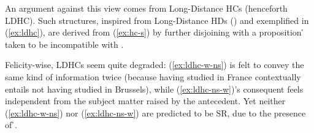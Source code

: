 An argument against this view comes from Long-Distance HCs (henceforth LDHC). Such structures, inspired from Long-Distance HDs (\cite{Marty2022}) and exemplified in (\ref{ex:ldhc}), are derived from (\ref{ex:hc-s}) by further disjoining \pplus{} with a proposition \r{} taken to be incompatible with \p. 


\begin{exe}
	\ex\label{ex:ldhc-surface}
	\begin{xlist}
		\label{ex:ldhc-w-ns}
		\label{ex:ldhc-ns-w}
	\end{xlist}
\end{exe}

Felicity-wise, LDHCs seem quite degraded: (\ref{ex:ldhc-w-ns}) is felt to convey the same kind of information twice (because having studied in France contextually entails not having studied in Brussels), while (\ref{ex:ldhc-ns-w})'s consequent feels independent from the subject matter raised by the antecedent. Yet neither (\ref{ex:ldhc-w-ns}) nor (\ref{ex:ldhc-ns-w}) are predicted to be SR, due to the presence of \r{}.

